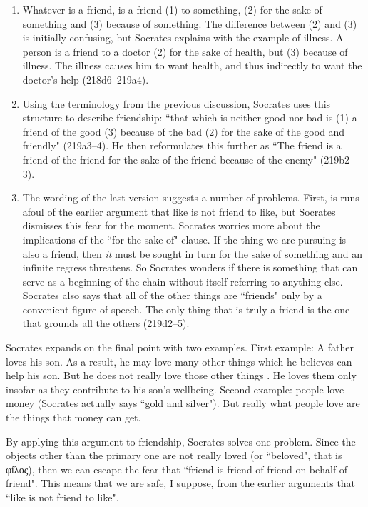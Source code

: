\documentclass[11pt]{article}
\begin{document}
\begin{enumerate}
    \item Whatever is a friend, is a friend (1) to something, (2) for the sake of something and (3) because of something.  The difference between (2) and (3) is initially confusing, but Socrates explains with the example of illness.  A person is a friend to a doctor (2) for the sake of health, but (3) because of illness.  The illness causes him to want health, and thus indirectly to want the doctor's help (218d6--219a4).
    \item Using the terminology from the previous discussion, Socrates uses this structure to describe friendship: ``that which is neither good nor bad is (1) a friend of the good (3) because of the bad (2) for the sake of the good and friendly" (219a3--4).  He then reformulates this further as ``The friend is a friend of the friend for the sake of the friend because of the enemy" (219b2--3).
    \item The wording of the last version suggests a number of problems.  First, is runs afoul of the earlier argument that like is not friend to like, but Socrates dismisses this fear for the moment.  Socrates worries more about the implications of the ``for the sake of" clause.  If the thing we are pursuing is also a friend, then \emph{it} must be sought in turn for the sake of something and an infinite regress threatens.  So Socrates wonders if there is something that can serve as a beginning of the chain without itself referring to anything else.  Socrates also says that all of the other things are ``friends" only by a convenient figure of speech.  The only thing that is truly a friend is the one that grounds all the others (219d2--5).
\end{enumerate}

Socrates expands on the final point with two examples.  First example: A father loves his son.  As a result, he may love many other things which he believes can help his son.  But he does not really love those other things . He loves them only insofar as they contribute to his son's wellbeing.  Second example: people love money (Socrates actually says ``gold and silver").  But really what people love are the things that money can get.

By applying this argument to friendship, Socrates solves one problem.  Since the objects other than the primary one are not really loved (or ``beloved", that is {\g φίλος}), then we can escape the fear that ``friend is friend of friend on behalf of friend".  This means that we are safe, I suppose, from the earlier arguments that ``like is not friend to like".
\end{document}
